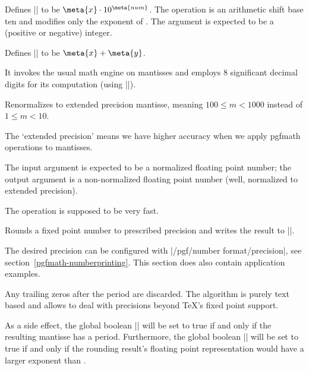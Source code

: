 \begin{command}{}
	Defines |\pgfmathresult| to be $\meta{x} \cdot 10^{\meta{num}}$. The operation is an arithmetic shift base ten and modifies only the exponent of . The argument  is expected to be a (positive or negative) integer.
\end{command}

\begin{command}{}
	Defines |\pgfmathresult| to be $\meta{x} + \meta{y}$.

	It invokes the usual math engine on mantisses and employs 8 significant decimal digits for its computation (using |\pgfmathfloattoextentedprecision|).
\end{command}

\begin{command}{}
Renormalizes  to extended precision mantisse, meaning
$100 \le m < 1000$ instead of $1 \le m < 10$.

The `extended precision' means we have higher accuracy when we apply pgfmath operations to mantisses.

The input argument is expected to be a normalized floating point number; the output argument is a non-normalized floating point number (well, normalized to extended precision).

The operation is supposed to be very fast.
\end{command}

\begin{command}{}
	Rounds a fixed point number to prescribed precision and writes the result to |\pgfmathresult|.

	The desired precision can be configured with |/pgf/number format/precision|, see section~\ref{pgfmath-numberprinting}. This section does also contain application examples.
	
	Any trailing zeros after the period are discarded. The algorithm is purely text based and allows to deal with precisions beyond \TeX's fixed point support.

	As a side effect, the global boolean |\ifpgfmathfloatroundhasperiod| will be set to true if and only if the resulting mantisse has a period. Furthermore, the global boolean |\ifpgfmathfloatroundmayneedrenormalize| will be set to true if and only if the rounding result's floating point representation would have a larger exponent than . 
\begin{codeexample}[]
\pgfmathresult
\end{codeexample}
\begin{codeexample}[]
\pgfmathresult
\end{codeexample}
\begin{codeexample}[]
\pgfmathresult
\end{codeexample}
\end{command}

